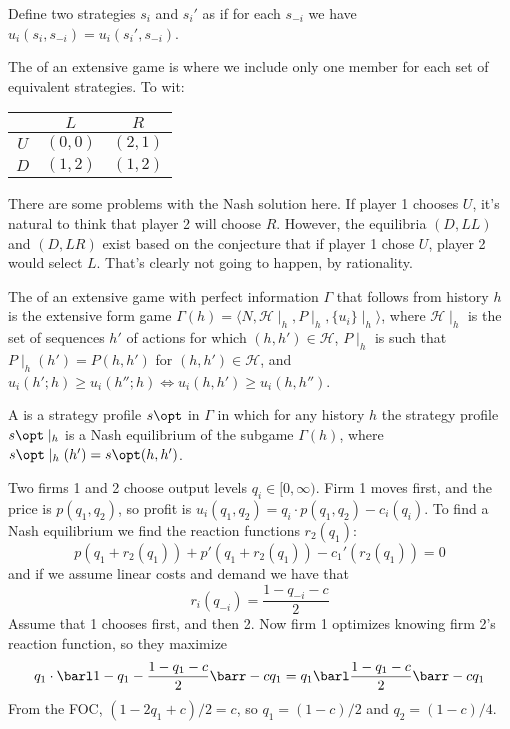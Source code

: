 \documentclass[10pt]{article}
\begin{document}
\begin{definition}
	Define two strategies $s_i$ and $s_i'$ as  if for each $s_{-i}$ we have $u_i(s_i,s_{-i}) = u_i(s_i',s_{-i})$.
\end{definition}
\begin{definition}
	The  of an extensive game is where we include only one member for each set of equivalent strategies. To wit:
	\begin{center}
		\begin{tabular}{c|cc}
			& $L$ & $R$ \\\hline
			$U$ & $(0,0)$ & $(2,1)$ \\
			$D$ & $(1,2)$ & $(1,2)$
		\end{tabular}
	\end{center}
\end{definition}

\begin{remark}
	There are some problems with the Nash solution here. If player 1 chooses $U$, it's natural to think that player 2 will choose $R$. However, the equilibria $(D,LL)$ and $(D,LR)$ exist based on the conjecture that if player 1 chose $U$, player 2 would select $L$. That's clearly not going to happen, by rationality.
\end{remark}

\begin{definition}
	The  of an extensive game with perfect information $\Gamma$ that follows from history $h$ is the extensive form game $\Gamma(h) = \langle N,\mathcal{H}\mid_h, P\mid_h,\{u_i\}\mid_h\rangle$, where $\mathcal{H}\mid_h$ is the set of sequences $h'$ of actions for which $(h,h') \in \mathcal{H}$, $P\mid_h$ is such that $P\mid_h(h') = P(h,h')$ for $(h,h') \in \mathcal{H}$, and $u_i(h';h) \ge u_i(h'';h) \Longleftrightarrow u_i(h,h') \ge u_i(h,h'')$.
\end{definition}

\begin{definition}
	A  is a strategy profile $s\opt$ in $\Gamma$ in which for any history $h$ the strategy profile $s\opt \mid_h$ is a Nash equilibrium of the subgame $\Gamma(h)$, where $s\opt \mid_h(h') = s\opt(h,h')$.
\end{definition}

\begin{example}
	 Two firms 1 and 2 choose output levels $q_i \in [0,\infty)$. Firm 1 moves first, and the price is $p(q_1,q_2)$, so profit is $u_i(q_1,q_2) = q_i \cdot p(q_1,q_2) - c_i(q_i)$. To find a Nash equilibrium we find the reaction functions $r_2(q_1)$: \[p(q_1 + r_2(q_1)) + p'(q_1 + r_2(q_1)) - c_1'(r_2(q_1)) = 0\]and if we assume linear costs and demand we have that \[r_i(q_{-i}) = \frac{1 - q_{-i} - c}{2}\]Assume that 1 chooses first, and then 2. Now firm 1 optimizes knowing firm 2's reaction function, so they maximize \[q_1 \cdot \barl 1 - q_1 - \frac{1-q_1-c}{2}\barr - cq_1 = q_1 \barl \frac{1-q_1-c}{2}\barr - cq_1\]From the FOC, $(1 - 2q_1 + c) / 2 = c$, so $q	_1 = (1-c)/2$ and $q_2 = (1-c)/4$.
\end{example}
\end{document}
